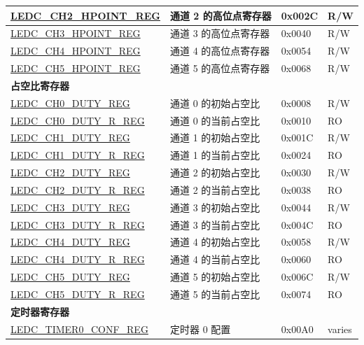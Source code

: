 \begin{longtable}{ | p{5.5cm} | p{7cm} | p{1.3cm} | p{1.7cm} | }
\hyperref[regdesc:LEDCCHNHPOINTREG]{LEDC\_CH2\_HPOINT\_REG} & 通道 2 的高位点寄存器 & 0x002C & R/W \\ \hline
\hyperref[regdesc:LEDCCHNHPOINTREG]{LEDC\_CH3\_HPOINT\_REG} & 通道 3 的高位点寄存器 & 0x0040 & R/W \\ \hline
\hyperref[regdesc:LEDCCHNHPOINTREG]{LEDC\_CH4\_HPOINT\_REG} & 通道 4 的高位点寄存器 & 0x0054 & R/W \\ \hline
\hyperref[regdesc:LEDCCHNHPOINTREG]{LEDC\_CH5\_HPOINT\_REG} & 通道 5 的高位点寄存器 & 0x0068 & R/W \\ \hline
\multicolumn{4}{|l|}{\textbf{占空比寄存器}} \\ \hline
\hyperref[regdesc:LEDCCHNDUTYREG]{LEDC\_CH0\_DUTY\_REG} & 通道 0 的初始占空比 & 0x0008 & R/W \\ \hline
\hyperref[regdesc:LEDCCHNDUTYRREG]{LEDC\_CH0\_DUTY\_R\_REG} & 通道 0 的当前占空比 & 0x0010 & RO \\ \hline
\hyperref[regdesc:LEDCCHNDUTYREG]{LEDC\_CH1\_DUTY\_REG} & 通道 1 的初始占空比 & 0x001C & R/W \\ \hline
\hyperref[regdesc:LEDCCHNDUTYRREG]{LEDC\_CH1\_DUTY\_R\_REG} & 通道 1 的当前占空比 & 0x0024 & RO \\ \hline
\hyperref[regdesc:LEDCCHNDUTYREG]{LEDC\_CH2\_DUTY\_REG} & 通道 2 的初始占空比 & 0x0030 & R/W \\ \hline
\hyperref[regdesc:LEDCCHNDUTYRREG]{LEDC\_CH2\_DUTY\_R\_REG} & 通道 2 的当前占空比 & 0x0038 & RO \\ \hline
\hyperref[regdesc:LEDCCHNDUTYREG]{LEDC\_CH3\_DUTY\_REG} & 通道 3 的初始占空比 & 0x0044 & R/W \\ \hline
\hyperref[regdesc:LEDCCHNDUTYRREG]{LEDC\_CH3\_DUTY\_R\_REG} & 通道 3 的当前占空比 & 0x004C & RO \\ \hline
\hyperref[regdesc:LEDCCHNDUTYREG]{LEDC\_CH4\_DUTY\_REG} & 通道 4 的初始占空比 & 0x0058 & R/W \\ \hline
\hyperref[regdesc:LEDCCHNDUTYRREG]{LEDC\_CH4\_DUTY\_R\_REG} & 通道 4 的当前占空比 & 0x0060 & RO \\ \hline
\hyperref[regdesc:LEDCCHNDUTYREG]{LEDC\_CH5\_DUTY\_REG} & 通道 5 的初始占空比 & 0x006C & R/W \\ \hline
\hyperref[regdesc:LEDCCHNDUTYRREG]{LEDC\_CH5\_DUTY\_R\_REG} & 通道 5 的当前占空比 & 0x0074 & RO \\ \hline
\multicolumn{4}{|l|}{\textbf{定时器寄存器}} \\ \hline
\hyperref[regdesc:LEDCTIMERXCONFREG]{LEDC\_TIMER0\_CONF\_REG} & 定时器 0 配置 & 0x00A0 & varies \\ \hline

\end{longtable}
